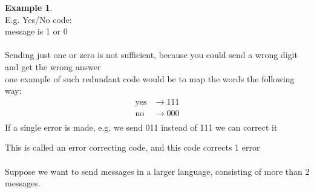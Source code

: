 \documentclass[]{article}
\theoremstyle{definition}
\newtheorem*{exmp}{Example}
\theoremstyle{remark}
\numberwithin{equation}{section}
\begin{document}
		\begin{exmp}\hfill\\
		E.g. Yes/No code:\\
		message is 1 or 0\\
		\\
		Sending just one or zero is not sufficient, because you could send a wrong digit and get the wrong answer\\

		one example of such redundant code would be to map the words the following way: \\
			\begin{align*}
				\text{yes} &\rightarrow 111\\
				\text{no} &\rightarrow 000\\
			\end{align*}
		If a single error is made, e.g. we send 011 instead of 111 we can correct it
		\end{exmp}
		This is called an error correcting code, and this code corrects 1 error\\
		\\
		Suppose we want to send messages in a larger language, consisting of more than 2 messages.\\
\end{document}
